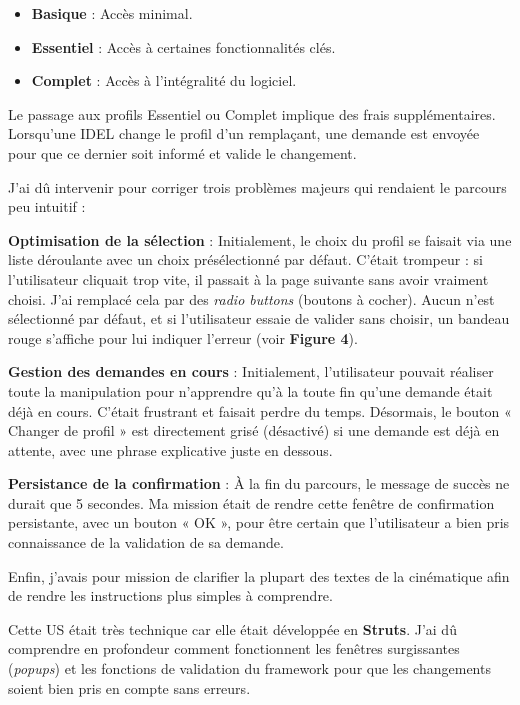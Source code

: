 \documentclass{article}
\begin{document}
\begin{itemize}
    \item \textbf{Basique} : Accès minimal.
    \item \textbf{Essentiel} : Accès à certaines fonctionnalités clés.
    \item \textbf{Complet} : Accès à l'intégralité du logiciel.
\end{itemize}

Le passage aux profils Essentiel ou Complet implique des frais supplémentaires. Lorsqu'une IDEL change le profil d'un remplaçant, une demande est envoyée pour que ce dernier soit informé et valide le changement.


J'ai dû intervenir pour corriger trois problèmes majeurs qui rendaient le parcours peu intuitif :

\textbf{Optimisation de la sélection} :
Initialement, le choix du profil se faisait via une liste déroulante avec un choix présélectionné par défaut. C'était trompeur : si l'utilisateur cliquait trop vite, il passait à la page suivante sans avoir vraiment choisi. J'ai remplacé cela par des \textit{radio buttons} (boutons à cocher). Aucun n'est sélectionné par défaut, et si l'utilisateur essaie de valider sans choisir, un bandeau rouge s'affiche pour lui indiquer l'erreur (voir \textbf{Figure 4}).


\textbf{Gestion des demandes en cours} :
Initialement, l'utilisateur pouvait réaliser toute la manipulation pour n'apprendre qu'à la toute fin qu'une demande était déjà en cours. C'était frustrant et faisait perdre du temps. Désormais, le bouton « Changer de profil » est directement grisé (désactivé) si une demande est déjà en attente, avec une phrase explicative juste en dessous.

\textbf{Persistance de la confirmation} :
À la fin du parcours, le message de succès ne durait que 5 secondes. Ma mission était de rendre cette fenêtre de confirmation persistante, avec un bouton « OK », pour être certain que l'utilisateur a bien pris connaissance de la validation de sa demande.

Enfin, j'avais pour mission de clarifier la plupart des textes de la cinématique afin de rendre les instructions plus simples à comprendre.

Cette US était très technique car elle était développée en \textbf{Struts}. J'ai dû comprendre en profondeur comment fonctionnent les fenêtres surgissantes (\textit{popups}) et les fonctions de validation du framework pour que les changements soient bien pris en compte sans erreurs.
\end{document}
